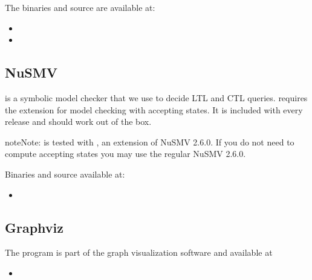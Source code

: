 \documentclass[letterpaper,10pt,english]{sphinxmanual}
\begin{document}
The binaries and source are available at:
\begin{itemize}
\item {} 

\item {} 

\end{itemize}


\subsection{NuSMV}
\label{\detokenize{Installation:nusmv}}\label{\detokenize{Installation:installation-nusmv}}
 is a symbolic model checker that we use to decide LTL and CTL queries.
 requires the extension  for model checking with accepting states.
It is included with every release and should work out of the box.

\begin{sphinxadmonition}{note}{Note:}
 is tested with , an extension of NuSMV 2.6.0. If you do not need to compute accepting states you may use the regular NuSMV 2.6.0.
\end{sphinxadmonition}

Binaries and source available at:
\begin{itemize}
\item {} 

\end{itemize}


\subsection{Graphviz}
\label{\detokenize{Installation:graphviz}}\label{\detokenize{Installation:installation-graphviz}}
The program  is part of the graph visualization software  and available at
\begin{itemize}
\item {} 

\end{itemize}
\end{document}
